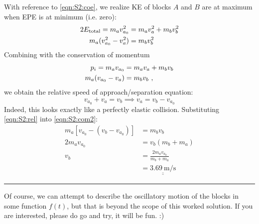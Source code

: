 \documentclass[answers]{exam}
\def\doubleunderline#1{\underline{\underline{#1}}}
\begin{document}
\begin{questions}
{\begin{solutionorbox}[170mm]
			With reference to \eqref{eqn:S2:coe}, we realize KE of blocks $A$ and $B$ are at maximum when EPE is at minimum (i.e. zero):
			\vspace{-0.3cm}
			\begin{align}
				2E_{\text{total}} = m_av_{a_0}^2 &= m_av_a^2 + m_bv_b^2 \notag \\
				m_a(v_{a_0}^2 - v_a^2) &= m_bv_b^2
			\end{align}
			Combining with the conservation of momentum
			\begin{align}
				p_i = m_av_{a_0} &= m_av_a + m_bv_b \notag\\
				m_a(v_{a_0} - v_a) &= m_bv_b~, \label{eqn:S2:com2}
			\end{align}
			we obtain the relative speed of approach/separation equation:
			\begin{equation}
				v_{a_0} + v_a = v_b \implies v_a = v_b - v_{a_0} \label{eqn:S2:rel} 
			\end{equation}
			Indeed, this looks exactly like a perfectly elastic collision. Substituting \eqref{eqn:S2:rel} into  \eqref{eqn:S2:com2}:
			\begin{align*}
				m_a\left[v_{a_0} - \left(v_b - v_{a_0}\right)\right] &= m_bv_b \\
				2m_av_{a_0} &= v_b\left(m_b+m_a\right) \\
				v_b &= \frac{2m_av_{a_0}}{m_b+m_a} \\
				&= \doubleunderline{\SI{3.69}{\meter\per\second}}
			\end{align*}
			
			{\color{black!30!} \hrule}
			\vspace{0.3cm}
			Of course, we can attempt to describe the oscillatory motion of the blocks in some function $f(t)$, but that is beyond the scope of this worked solution. If you are interested, please do go and try, it will be fun. :)
		\end{solutionorbox}
		}
		
	\end{questions}
\end{document}

